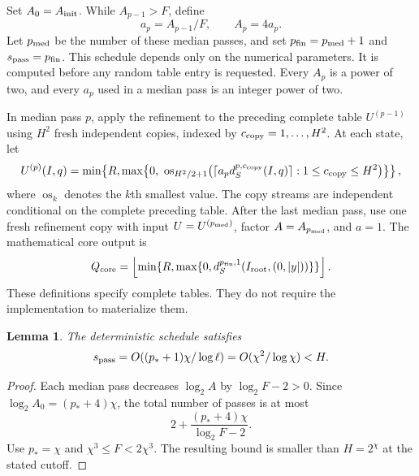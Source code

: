 \documentclass[11pt]{article}
\newtheorem{lemma}[theorem]{Lemma}
\theoremstyle{definition}
\newcommand{\1}{\mathbf 1}
\begin{document}
Set $A_0=A_{\rm init}$. While $A_{p-1}>F$, define
\[
 a_p=A_{p-1}/F,\qquad A_p=4a_p.
\]
Let $p_{\rm med}$ be the number of these median passes, and set
$p_{\rm fin}=p_{\rm med}+1$ and $s_{\rm pass}=p_{\rm fin}$.
This schedule depends only on the numerical parameters.
It is computed before any random table entry is requested.
Every $A_p$ is a power of two, and every $a_p$ used in a median pass is
an integer power of two.

In median pass $p$, apply the refinement to the preceding complete table
$U^{(p-1)}$ using $H^2$ fresh independent copies, indexed by
$c_{\rm copy}=1,\ldots,H^2$. At each state, let
\[
 U^{(p)}(I,q)=
 \min\!\left\{R,\max\!\left\{0,\
 \operatorname{os}_{H^2/2+1}
 \bigl(\lceil a_p d_S^{p,c_{\rm copy}}(I,q)\rceil:
          1\le c_{\rm copy}\le H^2\bigr)\right\}\right\},
\]
where $\operatorname{os}_k$ denotes the $k$th smallest value.
The copy streams are independent conditional on the complete preceding
table. After the last median pass, use one fresh refinement copy with input
$U=U^{(p_{\rm med})}$, factor $A=A_{p_{\rm med}}$, and $a=1$.
The mathematical core output is
\[
 Q_{\rm core}=
 \left\lfloor
   \min\{R,\max\{0,d_S^{p_{\rm fin},1}
                 (I_{\rm root},(0,|y|))\}\}
 \right\rfloor.
\]
These definitions specify complete tables. They do not require the
implementation to materialize them.

\begin{lemma}\label{core:lem:pass-count}
The deterministic schedule satisfies
\[
 s_{\rm pass}=O((p_*+1)\chi/\log\ell)
              =O(\chi^2/\log\chi)<H.
\]
\end{lemma}
\begin{proof}
Each median pass decreases $\log_2A$ by $\log_2F-2>0$.
Since $\log_2A_0=(p_*+4)\chi$, the total number of passes is at most
\[
 2+\frac{(p_*+4)\chi}{\log_2F-2}.
\]
Use $p_*=\chi$ and $\chi^3\le F<2\chi^3$.
The resulting bound is smaller than $H=2^\chi$ at the stated cutoff.
\end{proof}
\end{document}
